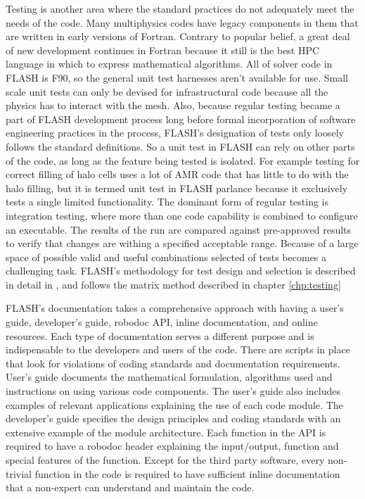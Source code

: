 Testing is another area where the standard practices do not adequately
meet the needs of the code. Many multiphysics codes have legacy
components in them that are written in early versions of
Fortran. Contrary to popular belief, a great deal of new development
continues in Fortran because it still is the best HPC language
in which to express mathematical algorithms. All of solver code in
FLASH is F90, so the general unit test harnesses aren't available for
use. Small scale unit tests can only be devised for infrastructural
code because all the physics has to interact with the mesh. Also,
because regular testing became a part of FLASH development process
long before formal incorporation of software engineering practices in
the process, FLASH's designation of tests only loosely follows the
standard definitions. So a unit test in FLASH can rely on other parts
of the code, as long as the feature being tested is isolated. For
example testing for correct filling of halo cells uses a lot of AMR
code that has little to do with the halo filling, but it is termed
unit test in FLASH parlance because it exclusively tests a single
limited functionality. The dominant form of regular testing is
integration testing, where more than one code capability is combined to
configure an executable. The results of the run are compared against
pre-approved results to verify that changes are withing a specified
acceptable range. Because of a
large space of possible valid and useful combinations selected of tests
becomes a challenging task. FLASH's methodology for test design and
selection is described in detail in \cite{Dubey2015}, and follows the
matrix method described in chapter \ref{chp:testing}

FLASH's documentation takes a comprehensive approach with having a
user's guide, developer's guide, robodoc API, inline documentation,
and online resources. Each type of documentation serves a different
purpose and is indispensable to the developers and users of the code.  
There are scripts in place that look for violations of coding
standards and documentation requirements. User's guide documents the
mathematical formulation, algorithms used and instructions on using
various code components. The user's guide also includes examples of
relevant applications explaining the use of each code module. The
developer's guide specifies the design principles and coding standards
with an extensive example of the module architecture. Each function in
the API is required to have a robodoc header explaining the
input/output, function and special features of the function. Except
for the third party software, every non-trivial function in the code
is required to have sufficient inline documentation that a non-expert
can understand and maintain the code.

